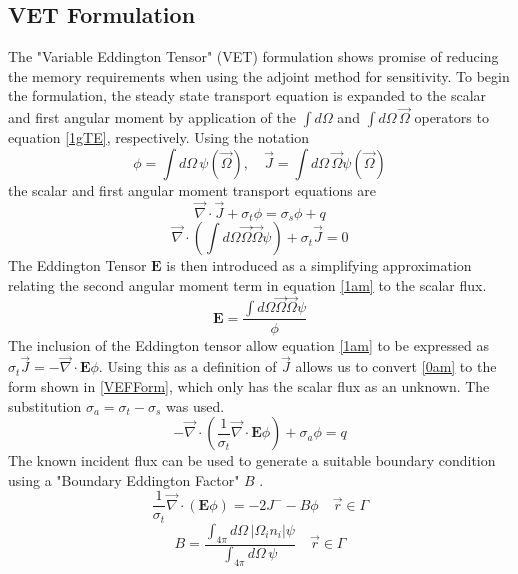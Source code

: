 \documentclass{article}
\newcommand{\vr}{\vec{r}}
\newcommand{\vO}{\vec{\Omega}}
\newcommand{\vdiv}{\vec{\nabla} \cdot}
\newcommand{\Edd}{\mathbf{E}}
\newcommand{\sigt}{\sigma_t}
\newcommand{\sigs}{\sigma_s}
\newcommand{\siga}{\sigma_a}
\newcommand{\scalSource}{q}
\begin{document}
\subsection{VET Formulation}
The "Variable Eddington Tensor" (VET) formulation shows promise of reducing the memory requirements when using the adjoint method for sensitivity. To begin the formulation, the steady state transport equation is expanded to the scalar and first angular moment by application of the $\int d \Omega$ and $\int d \Omega \, \vO$ operators to equation \ref{1gTE}, respectively. Using the notation
\begin{equation}
\phi=\int d\Omega \, \psi( \vO )
,\quad
\vec{J}= \int d\Omega \, \vO \psi( \vO )
\end{equation}
the scalar and first angular moment transport equations are
\begin{equation}
\label{0am}
\vdiv \vec{J} + \sigt \phi = \sigs \phi + \scalSource
\end{equation}
\begin{equation}
\label{1am}
\vdiv \left(  \int d\Omega \vO \vO \psi \right) + \sigt \vec{J} =0 
\end{equation}
The Eddington Tensor $\Edd$ is then introduced as a simplifying approximation relating the second angular moment term in equation \ref{1am} to the scalar flux. 
\begin{equation}
\label{EddDef}
\Edd=\frac{\int d\Omega \vO \vO \psi}{\phi}
\end{equation}
The inclusion of the Eddington tensor allow equation \ref{1am} to be expressed as $\sigt \vec{J} = - \vdiv \Edd \phi$. Using this as a definition of $\vec{J}$ allows us to convert \ref{0am} to the form shown in \ref{VEFForm}, which only has the scalar flux as an unknown. The substitution $\siga = \sigt-\sigs$ was used.
\begin{equation}
\label{VEFForm}
- \vdiv \left( \frac{1}{\sigt}\vdiv \Edd \phi \right) + \siga \phi = \scalSource
\end{equation}
The known incident flux can be used to generate a suitable boundary condition using a "Boundary Eddington Factor" $B$ \cite{Miften}.
\begin{equation}
\frac{1}{\sigma_{t} } \vec{\nabla} \cdot \left(\Edd \phi \right)  = - 2J^- - B \phi \quad \vr \in \Gamma
\end{equation}
\begin{equation}
B= \frac{\int_{4 \pi} d\Omega \, \left| \Omega_i n_i \right | \psi}{\int_{4\pi} d\Omega \, \psi} \quad \vr \in \Gamma
\end{equation}
\end{document}
